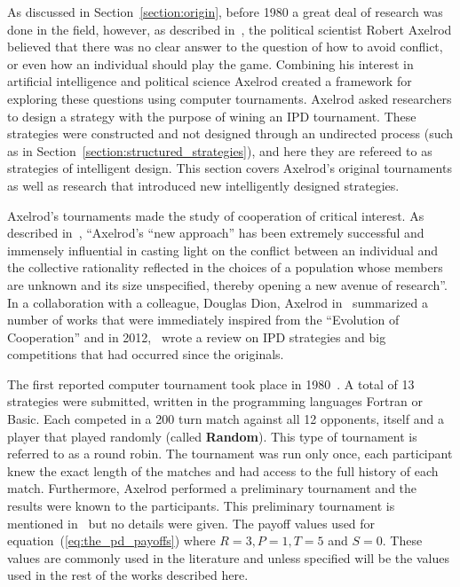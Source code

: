 \documentclass{article}
\theoremstyle{definition}
\begin{document}
As discussed in Section~\ref{section:origin}, before 1980 a great deal of
research was done in the field, however, as described in~\cite{Axelrod2012}, the
political scientist Robert Axelrod believed that there was no clear answer to the
question of how to avoid conflict, or even how an individual should play the
game. Combining his interest in artificial intelligence and political science
Axelrod created a framework for exploring these questions using computer
tournaments. Axelrod asked researchers to design a strategy with the purpose of
wining an IPD tournament. These strategies were constructed and not designed
through an undirected process (such as in
Section~\ref{section:structured_strategies}), and here they are refereed to as
strategies of intelligent design. This section covers Axelrod's original
tournaments as well as research that introduced new intelligently designed
strategies.

Axelrod's tournaments made the study of cooperation of critical interest. As
described in~\cite{Rapoport2015}, ``Axelrod's “new approach” has been extremely
successful and immensely influential in casting light on the conflict between an
individual and the collective rationality reflected in the choices of a
population whose members are unknown and its size unspecified, thereby opening a
new avenue of research''. In a collaboration with a colleague, Douglas Dion,
Axelrod in~\cite{Axelrod1988} summarized a number of works that were immediately
inspired from the ``Evolution of Cooperation'' and in 2012,~\cite{Jurisic2012}
wrote a review on IPD strategies and big competitions
that had occurred since the originals.

The first reported computer tournament took place in 1980~\cite{Axelrod1980a}. A
total of 13 strategies were submitted, written in the programming languages
Fortran or Basic. Each competed in a 200 turn match against all 12 opponents,
itself and a player that played randomly (called \textbf{Random}). This type of
tournament is referred to as a round robin. The tournament was run only once,
each participant knew the exact length of the matches and had access to the full
history of each match. Furthermore, Axelrod performed a preliminary tournament
and the results were known to the participants. This preliminary tournament is
mentioned in~\cite{Axelrod1980a} but no details were given. The payoff values
used for equation~(\ref{eq:the_pd_payoffs}) where \(R=3, P=1, T=5\) and \(S=0\).
These values are commonly used in the literature and unless specified will be
the values used in the rest of the works described here.
\end{document}
